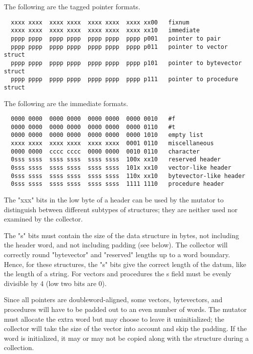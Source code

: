 The following are the tagged pointer formats.

\begin{minipage}{\linewidth}
\begin{verbatim}
  xxxx xxxx  xxxx xxxx  xxxx xxxx  xxxx xx00   fixnum
  xxxx xxxx  xxxx xxxx  xxxx xxxx  xxxx xx10   immediate
  pppp pppp  pppp pppp  pppp pppp  pppp p001   pointer to pair 
  pppp pppp  pppp pppp  pppp pppp  pppp p011   pointer to vector struct
  pppp pppp  pppp pppp  pppp pppp  pppp p101   pointer to bytevector struct
  pppp pppp  pppp pppp  pppp pppp  pppp p111   pointer to procedure struct
\end{verbatim}
\end{minipage}

The following are the immediate formats.

\begin{minipage}{\linewidth}
\begin{verbatim}
  0000 0000  0000 0000  0000 0000  0000 0010   #f
  0000 0000  0000 0000  0000 0000  0000 0110   #t
  0000 0000  0000 0000  0000 0000  0000 1010   empty list
  xxxx xxxx  xxxx xxxx  xxxx xxxx  0001 0110   miscellaneous
  0000 0000  cccc cccc  0000 0000  0010 0110   character
  0sss ssss  ssss ssss  ssss ssss  100x xx10   reserved header
  0sss ssss  ssss ssss  ssss ssss  101x xx10   vector-like header
  0sss ssss  ssss ssss  ssss ssss  110x xx10   bytevector-like header
  0sss ssss  ssss ssss  ssss ssss  1111 1110   procedure header
\end{verbatim}
\end{minipage}

The "xxx" bits in the low byte of a header can be used by the mutator to
distinguish between different subtypes of structures; they are neither
used nor examined by the collector.

The "s" bits must contain the size of the data structure in bytes, not
including the header word, and not including padding (see below). The
collector will correctly round "bytevector" and "reserved" lengths up
to a word boundary. Hence, for these structures, the "s" bits give the
correct length of the datum, like the length of a string. For vectors
and procedures the s field must be evenly divisible by 4 (low two bits
are 0).

Since all pointers are doubleword-aligned, some vectors, bytevectors,
and procedures will have to be padded out to an even number of words.
The mutator must allocate the extra word but may choose to leave it
uninitialized; the collector will take the size of the vector into
account and skip the padding. If the word is initialized, it may or
may not be copied along with the structure during a collection.

